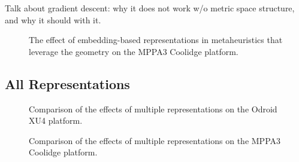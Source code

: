 Talk about gradient descent: why it does not work w/o metric space structure, and why it should with it.
\begin{figure}[h]
	\centering
   \resizebox{0.95\textwidth}{!}{}
	\caption{The effect of embedding-based representations in metaheuristics that leverage the geometry on the MPPA3 Coolidge platform.}
	\label{fig:coolidge_geometric}
\end{figure}

\subsection{All Representations}
\begin{figure}[h]
	\centering
   \resizebox{0.95\textwidth}{!}{}
	\caption{Comparison of the effects of multiple representations on the Odroid XU4 platform.}
	\label{fig:multiple_representations_exynos}
\end{figure}

\begin{figure}[h]
	\centering
   \resizebox{0.95\textwidth}{!}{}
	\caption{Comparison of the effects of multiple representations on the MPPA3 Coolidge platform.}
	\label{fig:multiple_representations_exynos}
\end{figure}